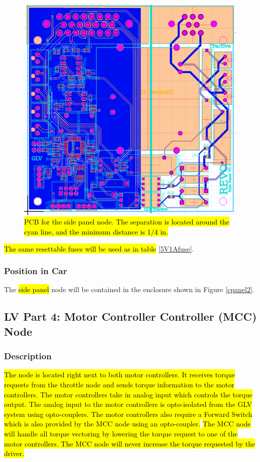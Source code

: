\documentclass{article}
\DeclareRobustCommand{\hlr}[1]{{\sethlcolor{red}\hl{#1}}}
\begin{document}
            \begin{figure}[H]
            \centering
            \includegraphics[width = 0.8 \textwidth]{panelPCB}
            \caption{\hlr{PCB for the side panel node. The separation is located around the cyan line, and the minimum distance is $1/4$ in.}}
            \label{panelPCB}
            \end{figure}

            \hlr{The same resettable fuses will be used as in table} \ref{5V1Afuse}.

        \subsubsection{Position in Car}

            The \hlr{side panel} node will be contained in the enclosure shown in Figure \ref{cpanel2}.

    \subsection{LV Part 4: Motor Controller Controller (MCC) Node}

        \subsubsection{Description}
            \hlr{The node is located right next to both motor controllers. It receives torque requests from the throttle node and sends torque information to the motor controllers. The motor controllers take in analog input which controls the torque output. The analog input to the motor controllers is opto-isolated from the GLV system using opto-couplers. The motor controllers also require a Forward Switch which is also provided by the MCC node using an opto-coupler.}
            \hlr{The MCC node will handle all torque vectoring by lowering the torque request to one of the motor controllers. The MCC node will never increase the torque requested by the driver.}\\
\end{document}
